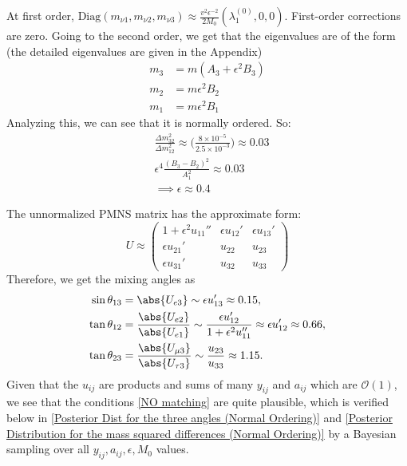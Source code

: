 At first order, $\text{Diag}(m_{\nu 1},m_{\nu 2},m_{\nu 3}) \approx \frac{v^2 \epsilon^{-2}}{2M_0}(\lambda_1^{(0)},0,0)$. First-order corrections are zero. Going to the second order, we get that the eigenvalues are of the form (the detailed eigenvalues are given in the Appendix)
\begin{align}
    m_3 &= m (A_3 + \epsilon^2 B_3)\\
    m_2 &= m \epsilon^2 B_2\\
    m_1 &= m \epsilon^2 B_1
\end{align}
Analyzing this, we can see that it is normally ordered.
So:
\begin{align}
    &\frac{\Delta m_{{32}}^2}{\Delta m_{{12}}^2} \approx \Big(\frac{8 \times 10^{-5}}{2.5 \times 10^{-3}} \Big) \approx 0.03\\
    & \epsilon^4 \frac{(B_3-B_2)^2}{A_1^2} \approx 0.03 \\
    &\implies \epsilon  \approx 0.4
\end{align}

The unnormalized PMNS matrix has the approximate form:
\begin{equation}
    U\approx 
    \begin{pmatrix}
    1 + \epsilon^2 u_{11}'' & \epsilon u_{12}' & \epsilon u_{13}' \\
    \epsilon u_{21}' & u_{22} & u_{23} \\
    \epsilon u_{31}' & u_{32} & u_{33}
    \end{pmatrix}
\end{equation}
Therefore, we get the mixing angles as
\begin{align} \label{NO matching}
    \sin \theta_{13} &= \abs{U_{e3}} \sim  \epsilon u_{13}' \approx 0.15,
    \\
    \tan \theta_{12} &= \frac{\abs{U_{e2}}}{\abs{U_{e1}}} \sim \frac{\epsilon u_{12}'}{ 1+\epsilon^2u_{11}''} \approx \epsilon u_{12}' \approx 0.66, \\
    \tan \theta_{23} &= \frac{\abs{U_{\mu3}}}{\abs{U_{\tau3}}} \sim \frac{u_{23}}{u_{33}} \approx 1.15.
\end{align}
Given that the $u_{ij}$ are products and sums of many $y_{ij}$ and $a_{ij}$ which are $\mathcal{O}(1)$, we see that the conditions \cref{NO matching} are quite plausible, which is verified below in \cref{Posterior Dist for the three angles (Normal Ordering)} and \cref{Posterior Distribution for the mass squared differences (Normal Ordering)} by a Bayesian sampling over all $y_{ij},a_{ij}, \epsilon, M_0$ values.

